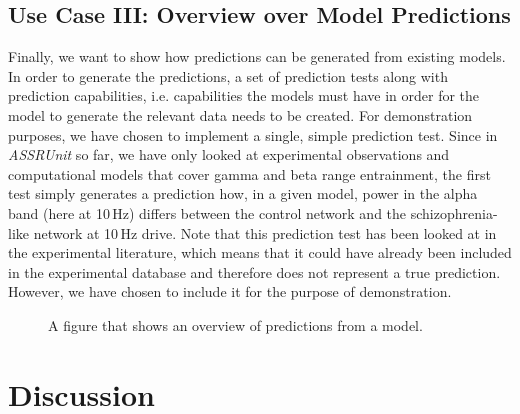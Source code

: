 \documentclass[a4paper,10pt]{article}
\begin{document}
\subsection{Use Case III: Overview over Model Predictions}
Finally, we want to show how predictions can be generated from existing models. In order to generate the predictions, a set of prediction tests along with prediction capabilities, i.e. capabilities the models must have 
in order for the model to generate the relevant data needs to be created. For demonstration purposes, we have chosen to implement a single, simple prediction test. Since in \textit{ASSRUnit} so far, we have only looked 
at experimental observations and computational models that cover gamma and beta range entrainment, the first test simply generates a prediction how, in a given model, power in the alpha band (here at 10\,Hz)
differs between the control network and the schizophrenia-like network at 10\,Hz drive.
Note that this prediction 
test has been looked at in the experimental literature, which means that it could have already been included in the experimental database and therefore does not represent a true prediction.
However, we have chosen to include it for the purpose of demonstration. 
\begin{figure}
\label{Fig:Tests4040}
\caption{A figure that shows an overview of predictions from a model.}
\end{figure}

\FloatBarrier
\section{Discussion}
\end{document}
